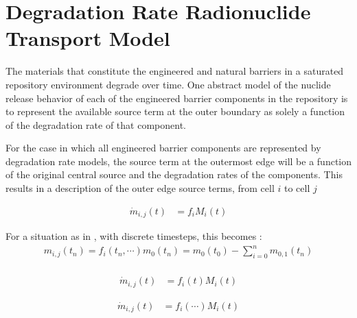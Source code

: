 \section{Degradation Rate Radionuclide Transport Model}\label{sec:deg_rate}

The materials that constitute the engineered and natural barriers in a saturated 
repository environment degrade over time. One abstract model of the nuclide 
release behavior of each of the engineered barrier components in the repository 
is to represent the available source term at the outer boundary as solely a 
function of the degradation rate of that component.

For the case in which all engineered barrier components are represented by 
degradation rate models, the source term at the outermost edge will be a 
function of the original central source and the degradation rates of the 
components. This results in a description of the outer edge source terms, 
from cell $i$ to cell $j$ 

\begin{align}
\dot{m}_{i,j}(t) &= f_iM_i(t)
\label{deg_rate}
\end{align}

For a situation as in \Cyclus, with discrete timesteps, this becomes :
\begin{align}
m_{i,j}(t_n) = f_i(t_n,\cdots)
m_0(t_n) = m_0(t_0) - \sum_{i=0}^n m_{0,1}(t_n)\\
\label{source}
\end{align}


\begin{align}
\dot{m}_{i,j}(t) &= f_i(t)M_i(t)
\label{deg_rate}
\end{align}

\begin{align}
\dot{m}_{i,j}(t) &= f_i(\cdots)M_i(t)
\label{deg_rate}
\end{align}
